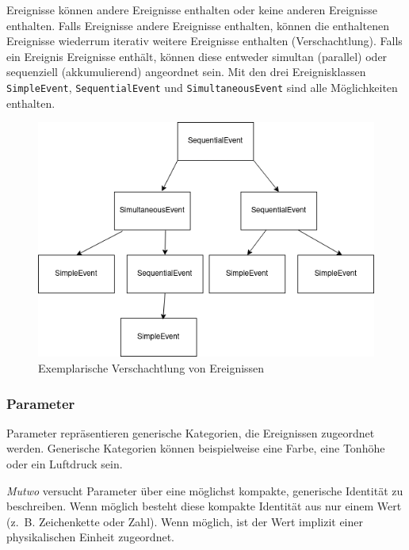 \documentclass[12pt,a4paper,ngerman]{article}
\begin{document}
Ereignisse können andere Ereignisse enthalten oder keine anderen Ereignisse enthalten.
Falls Ereignisse andere Ereignisse enthalten, können die enthaltenen Ereignisse wiederrum iterativ weitere Ereignisse enthalten (Verschachtlung).
Falls ein Ereignis Ereignisse enthält, können diese entweder simultan (parallel) oder sequenziell (akkumulierend) angeordnet sein.
Mit den drei Ereignisklassen \texttt{SimpleEvent}, \texttt{SequentialEvent} und \texttt{SimultaneousEvent} sind alle Möglichkeiten enthalten.

\begin{figure}[h!]
    \begin{center}
        \includegraphics[scale=0.65]{pictures/nested_event.png}

        \caption{Exemplarische Verschachtlung von Ereignissen}
    \end{center}
\end{figure}


\subsubsection{Parameter}
\label{parameterSpecification}

Parameter repräsentieren generische Kategorien, die Ereignissen zugeordnet werden.
Generische Kategorien können beispielweise eine Farbe, eine Tonhöhe oder ein Luftdruck sein.

\bigskip

\emph{Mutwo} versucht Parameter über eine möglichst kompakte, generische Identität zu beschreiben.
Wenn möglich besteht diese kompakte Identität aus nur einem Wert (z.~B. Zeichenkette oder Zahl).
Wenn möglich, ist der Wert implizit einer physikalischen Einheit zugeordnet.
\end{document}
